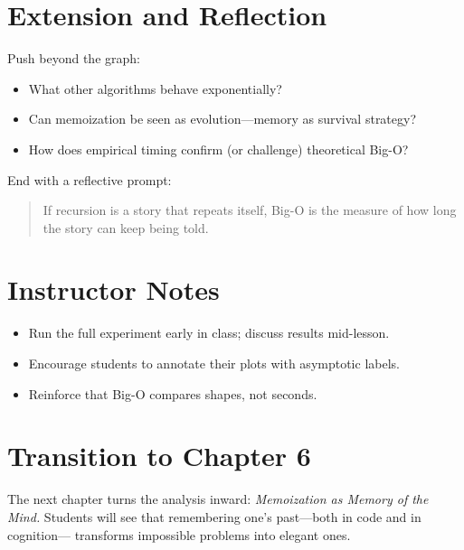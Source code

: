 \section{Extension and Reflection}
Push beyond the graph:
\begin{itemize}
  \item What other algorithms behave exponentially?
  \item Can memoization be seen as evolution—memory as survival strategy?
  \item How does empirical timing confirm (or challenge) theoretical Big-O?
\end{itemize}

End with a reflective prompt:
\begin{quote}
If recursion is a story that repeats itself,
Big-O is the measure of how long the story can keep being told.
\end{quote}

\section{Instructor Notes}
\begin{itemize}
  \item Run the full experiment early in class; discuss results mid-lesson.
  \item Encourage students to annotate their plots with asymptotic labels.
  \item Reinforce that Big-O compares shapes, not seconds.
\end{itemize}

\section{Transition to Chapter 6}
The next chapter turns the analysis inward:
\emph{Memoization as Memory of the Mind.}
Students will see that remembering one’s past—both in code and in cognition—
transforms impossible problems into elegant ones.

